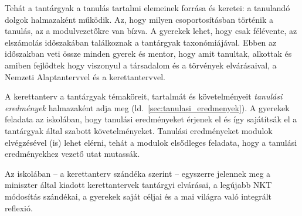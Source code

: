 Tehát a tantárgyak a tanulás tartalmi elemeinek forrása és keretei: a tanulandó dolgok halmazaként működik. Az, hogy milyen csoportosításban történik a tanulás, az a modulvezetőkre van bízva. A gyerekek lehet, hogy csak félévente, az elszámolás időszakában találkoznak a tantárgyak taxonómiájával. Ebben az időszakban veti össze minden gyerek és mentor, hogy amit tanultak, alkottak és amiben fejlődtek hogy viszonyul a társadalom és a törvények elvárásaival, a Nemzeti Alaptantervvel és a kerettantervvel.

A kerettanterv a tantárgyak témaköreit, tartalmát és követelményeit \emph{tanulási eredmények} halmazaként adja meg (ld.~\ref{sec:tanulasi_eredmenyek}). A gyerekek feladata az iskolában, hogy tanulási eredményeket érjenek el és így sajátítsák el a tantárgyak által szabott követelményeket. Tanulási eredményeket modulok elvégzésével (is) lehet elérni, tehát a modulok elsődleges feladata, hogy a tanulási eredményekhez vezető utat mutassák.

Az iskolában -- a kerettanterv szándéka szerint -- egyszerre jelennek meg a miniszter által kiadott kerettantervek tantárgyi elvárásai, a legújabb NKT módosítás szándékai, a gyerekek saját céljai és a mai világra való integrált reflexió. 

